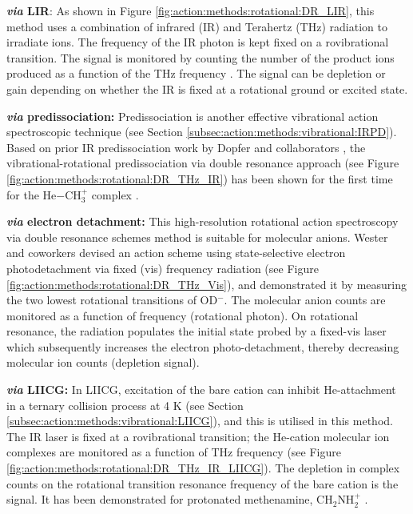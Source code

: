 \textbf{\emph{via} LIR}: As shown in Figure \ref{fig:action:methods:rotational:DR_LIR}, this method uses a combination of infrared (IR) and Terahertz (THz) radiation to irradiate ions. The frequency of the IR photon is kept fixed on a rovibrational transition. The signal is monitored by counting the number of the product ions produced as a function of the THz frequency \cite{Gartner2013,jusko_two-photon_2014}. The signal can be depletion or gain depending on whether the IR is fixed at a rotational ground or excited state.

\textbf{\emph{via} predissociation:} Predissociation is another effective vibrational action spectroscopic technique (see Section \ref{subsec:action:methods:vibrational:IRPD}). Based on prior IR predissociation work by Dopfer and collaborators \cite{olkhov_intermolecular_1999}, the vibrational-rotational predissociation via double resonance approach (see Figure \ref{fig:action:methods:rotational:DR_THz_IR}) has been shown for the first time for the He$-$CH$_3^+$ complex \cite{Topfer2018}.

\textbf{\emph{via} electron detachment:}
This high-resolution rotational action spectroscopy via double resonance schemes method is suitable for molecular anions. Wester and coworkers \cite{lee_terahertz-visible_2016} devised an action scheme using state-selective electron photodetachment via fixed  (vis) frequency radiation (see Figure \ref{fig:action:methods:rotational:DR_THz_Vis}), and demonstrated it by measuring the two lowest rotational transitions of OD$^-$. The molecular anion counts are monitored as a function of frequency (rotational photon). On rotational resonance, the radiation populates the initial state probed by a fixed-vis laser which subsequently increases the electron photo-detachment, thereby decreasing molecular ion counts (depletion signal).

\textbf{\emph{via} LIICG: } In LIICG, excitation of the bare cation can inhibit He-attachment in a ternary collision process at 4 K (see Section \ref{subsec:action:methods:vibrational:LIICG}), and this is utilised in this method. The IR laser is fixed at a rovibrational transition; the He-cation molecular ion complexes are monitored as a function of THz frequency (see Figure \ref{fig:action:methods:rotational:DR_THz_IR_LIICG}). The depletion in complex counts on the rotational transition resonance frequency of the bare cation is the signal. It has been demonstrated for protonated methenamine, CH$_2$NH$_2^+$ \cite{Markus2019}.

